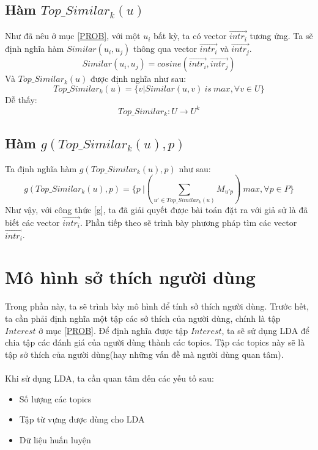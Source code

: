 \documentclass[12pt,a4paper]{report}
\begin{document}
\subsection{Hàm $Top\_Similar_k(u)$}
Như đã nêu ở mục \ref{PROB}, với một $u_i$ bất kỳ, ta có vector $\overrightarrow{intr_i}$ tương ứng. Ta sẽ định nghĩa hàm $Similar(u_i, u_j)$ thông qua vector $\overrightarrow{intr_i}$ và $\overrightarrow{intr_j}$.
\begin{equation} \label{Similar}
	Similar(u_i, u_j) = cosine(\overrightarrow{intr_i}, \overrightarrow{intr_j})
\end{equation}
Và $Top\_Similar_k(u)$ được định nghĩa như sau:
\begin{equation} \label{TopSimilar}
	Top\_Similar_k(u) = \lbrace v \vert Similar(u, v)\ is\  max, \forall v \in U \rbrace
\end{equation}
Dễ thấy:
\begin{equation}
	Top\_Similar_k : U \longrightarrow U^k
\end{equation}
\subsection{Hàm $g(Top\_Similar_k(u), p)$}
Ta định nghĩa hàm $g(Top\_Similar_k(u), p)$ như sau:
\begin{equation} \label{g}
g(Top\_Similar_k(u), p) = \lbrace p \ \vert \left(\sum_{u' \in Top\_Similar_k(u)}M_{u'p}\right) \ max, \forall p \in P \rbrace
\end{equation}
Như vậy, với công thức \ref{g}, ta đã giải quyết được bài toán đặt ra với giả sử là đã biết các vector $\overrightarrow{intr_i}$. Phần tiếp theo sẽ trình bày phương pháp tìm các vector $\overrightarrow{intr_i}$.

\section{Mô hình sở thích người dùng}
Trong phần này, ta sẽ trình bày mô hình để tính sở thích người dùng. Trước hết, ta cần phải định nghĩa một tập các sở thích của người dùng, chính là tập $Interest$ ở mục \ref{PROB}. Để định nghĩa được tập $Interest$, ta sẽ sử dụng LDA để chia tập các đánh giá của người dùng thành các topics. Tập các topics này sẽ là tập sở thích của người dùng(hay những vấn đề mà người dùng quan tâm).\\\\
Khi sử dụng LDA, ta cần quan tâm đến các yếu tố sau:
\begin{itemize}
\item Số lượng các topics
\item Tập từ vựng được dùng cho LDA
\item Dữ liệu huấn luyện
\end{itemize}
\end{document}
